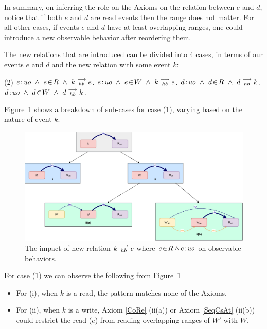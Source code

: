     In summary, on inferring the role on the Axioms on the relation between $e$ and $d$, notice that if both $e$ and $d$ are read events then the range does not matter. 
    For all other cases, if events $e$ and $d$ have at least overlapping ranges, one could introduce a new observable behavior after reordering them.
    
    The new relations that are introduced can be divided into 4 cases, in terms of our events $e$ and $d$ and the new relation with some event $k$:
    \begin{tasks}[style=enumerate](2)
        \task  $\et{e}{uo} \ \wedge \ \event{e}{R} \ \wedge \ \reln{k}{hb}{e}$.
        \task  $e\!:\!\textit{uo} \ \wedge \ e\!\in\!W \ \wedge \ k\stackrel{\longrightarrow}{_{hb}}e$.
        \task  $\et{d}{uo} \ \wedge \ \event{d}{R} \ \wedge \ \reln{d}{hb}{k}$.
        \task  $d\!:\!\textit{uo} \ \wedge \ d\!\in\!W \ \wedge \ d\stackrel{\longrightarrow}{_{hb}}k$.
    \end{tasks}
    
    Figure~\ref{reord:case1} shows a breakdown of sub-cases for case (1), varying based
    on the nature of event $k$.
    \begin{figure}[H]
        \centering
        \includegraphics[scale=0.6]{4.InstructionReordering/4.ValidReorderingCandidate/ProofParts/Part4/part4(a).pdf}
        \caption{The impact of new relation $k\stackrel{\longrightarrow}{_{hb}}e$ where $e\!\in\!R \wedge e\!:\!\textit{uo}$ on observable behaviors.}
        \label{reord:case1}
    \end{figure}
    
    For case (1) we can observe the following from Figure~\ref{reord:case1} 
    \begin{itemize}
        \item For (i), when $k$ is a read, the pattern matches none of the Axioms.
        \item For (ii), when $k$ is a write, Axiom \ref{CoRe} (ii(a)) or Axiom \ref{SeqCsAt} (ii(b)) could restrict the read ($e$) from reading overlapping ranges of $W'$ with $W$.
    \end{itemize}

